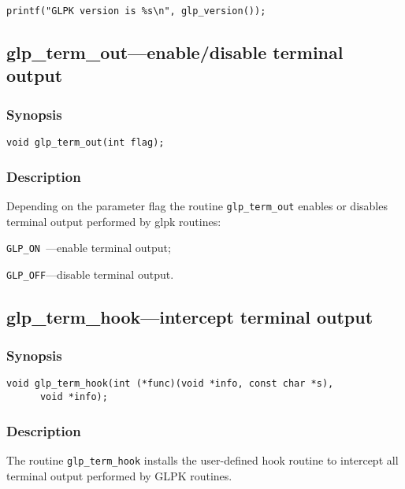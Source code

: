 \begin{verbatim}
printf("GLPK version is %s\n", glp_version());
\end{verbatim}

\subsection{glp\_term\_out---enable/disable terminal output}

\subsubsection*{Synopsis}

\begin{verbatim}
void glp_term_out(int flag);
\end{verbatim}

\subsubsection*{Description}

Depending on the parameter flag the routine \verb|glp_term_out| enables
or disables terminal output performed by glpk routines:

\verb|GLP_ON |---enable terminal output;

\verb|GLP_OFF|---disable terminal output.

\subsection{glp\_term\_hook---intercept terminal output}

\subsubsection*{Synopsis}

\begin{verbatim}
void glp_term_hook(int (*func)(void *info, const char *s),
      void *info);
\end{verbatim}

\subsubsection*{Description}

The routine \verb|glp_term_hook| installs the user-defined hook routine
to intercept all terminal output performed by GLPK routines.


